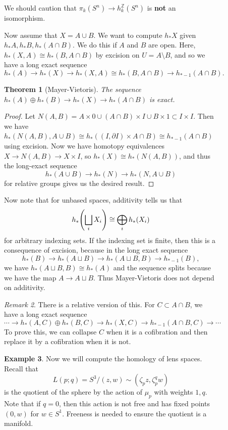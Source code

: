 \documentclass[leqno, openany]{memoir}
\newtheorem{thm}{Theorem}[section]
\theoremstyle{definition}
\newtheorem{exm}[thm]{Example}
\theoremstyle{remark}
\newtheorem{rmk}[thm]{Remark}
\theoremstyle{plain}
\theoremstyle{definition}
\theoremstyle{remark}
\newcommand{\Z}{\mathbb{Z}}
\begin{document}
\begin{figure}[H]
We should caution that $\pi_k(S^n) \to h_k^{\Z}(S^n)$ is \textbf{not} an
isomorphism.

Now assume that $X = A \cup B$. We want to compute $h_* X$ given $h_* A, h_* B,
h_*(A \cap B)$. We do this if $A$ and $B$ are open. Here, $h_*(X,A) \cong
h_*(B, A \cap B)$ by excision on $U = A \setminus B$, and so we have a long
exact sequence \[ h_*(A) \to h_*(X) \to h_*(X,A) \cong h_*(B, A \cap B) \to
h_{*-1}(A \cap B). \]

\begin{thm}[Mayer-Vietoris] The sequence $h_*(A) \oplus h_*(B) \to h_*(X) \to
h_*(A \cap B)$ is exact.  \end{thm}

\begin{proof} Let $N(A,B) = A \times 0 \cup (A \cap B) \times I \cup B \times 1
    \subset I \times I$. Then we have $h_*(N(A,B), A \cup B) \cong h_*((I,
    \partial I) \times A \cap B) \cong h_{*-1}(A \cap B)$ using excision. Now
    we have homotopy equivalences $X \to N(A,B) \to X \times I$, so $h_*(X)
    \cong h_*(N(A,B))$, and thus the long-exact sequence \[ h_*(A \cup B) \to
    h_*(N) \to h_*(N, A \cup B) \] for relative groups gives us the desired
result.  \end{proof}

Now note that for unbased spaces, additivity tells us that \[
h_*\qty(\bigsqcup_i X_i) \cong \bigoplus_i h_*(X_i) \] for arbitrary indexing
sets. If the indexing set is finite, then this is a consequence of excision,
because in the long exact sequence \[ h_*(B) \to h_*(A \sqcup B) \to h_*(A
\sqcup B, B) \to h_{*-1}(B), \] we have $h_*(A \sqcup B, B) \cong h_*(A)$ and
the sequence splits because we have the map $A \to A \sqcup B$. Thus
Mayer-Vietoris does not depend on additivity.

\begin{rmk} There is a relative version of this. For $C \subset A \cap B$, we
    have a long exact sequence \[ \cdots \to h_*(A,C) \oplus h_*(B,C) \to
    h_*(X,C) \to h_{*-1}(A \cap B, C) \to \cdots \] To prove this, we can
    collapse $C$ when it is a cofibration and then replace it by a cofibration
    when it is not.  \end{rmk}

\begin{exm} Now we will compute the homology of lens spaces. Recall that \[
L(p;q) = S^3/(z,w) \sim (\zeta_p z, \zeta_p^q w) \] is the quotient of the
sphere by the action of $\mu_p$ with weights $1,q$. Note that if $q=0$, then
this action is not free and has fixed points $(0,w)$ for $w \in S^1$. Freeness
is needed to ensure the quotient is a manifold.


\end{exm}
\end{figure}
\end{document}
